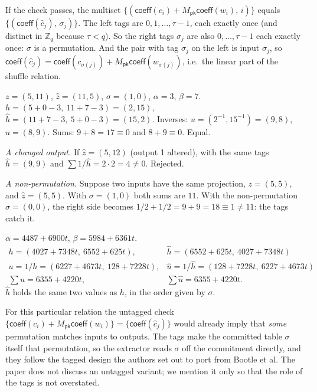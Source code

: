 \documentclass[11pt,a4paper]{article}
\newcommand{\Zq}{\mathbb{Z}_q}
\newcommand{\coeff}{\mathsf{coeff}}
\newcommand{\Mpk}{M_{\mathsf{pk}}}
\newcommand{\uh}{\hat{u}}
\newcommand{\hh}{\hat{h}}
\newcommand{\zh}{\hat{z}}
\newcommand{\ch}{\hat{c}}
\theoremstyle{definition}
\theoremstyle{plain}
\begin{document}
\begin{why}
If the check passes, the multiset $\{(\coeff(c_i)+\Mpk\coeff(w_i),\,i)\}$ equals
$\{(\coeff(\ch_j),\,\sigma_j)\}$. The left tags are $0,1,\dots,\tau-1$, each exactly once (and distinct in
$\Zq$ because $\tau<q$). So the right tags $\sigma_j$ are also $0,\dots,\tau-1$ each exactly once:
$\sigma$ is a permutation. And the pair with tag $\sigma_j$ on the left is input $\sigma_j$, so
$\coeff(\ch_j)=\coeff(c_{\sigma(j)})+\Mpk\coeff(w_{\sigma(j)})$, i.e.\ the linear part of the shuffle relation.
\end{why}

\begin{example}
$z=(5,11)$, $\zh=(11,5)$, $\sigma=(1,0)$, $\alpha=3$, $\beta=7$.
$h=(5+0-3,\ 11+7-3)=(2,15)$, $\hh=(11+7-3,\ 5+0-3)=(15,2)$.
Inverses: $u=(2^{-1},15^{-1})=(9,8)$, $\uh=(8,9)$. Sums: $9+8=17\equiv 0$ and $8+9\equiv 0$. Equal.

\emph{A changed output.} If $\zh=(5,12)$ (output 1 altered), with the same tags $\hh=(9,9)$ and
$\sum 1/\hh=2\cdot 2=4\neq 0$. Rejected.

\emph{A non-permutation.} Suppose two inputs have the same projection, $z=(5,5)$, and
$\zh=(5,5)$. With $\sigma=(1,0)$ both sums are $11$. With the non-permutation $\sigma=(0,0)$, the
right side becomes $1/2+1/2=9+9=18\equiv 1\neq 11$: the tags catch it.
\end{example}

\begin{toyrun}
$\alpha=4487{+}6900t$, $\beta=5984{+}6361t$.
\[
\begin{array}{ll}
h=(4027{+}7348t,\ 6552{+}625t), & \hh=(6552{+}625t,\ 4027{+}7348t)\\
u=1/h=(6227{+}4673t,\ 128{+}7228t), & \uh=1/\hh=(128{+}7228t,\ 6227{+}4673t)\\
\textstyle\sum u=6355{+}4220t, & \textstyle\sum\uh=6355{+}4220t .
\end{array}
\]
$\hh$ holds the same two values as $h$, in the order given by $\sigma$.
\end{toyrun}

\begin{caution}
For this particular relation the untagged check $\{\coeff(c_i)+\Mpk\coeff(w_i)\}=\{\coeff(\ch_j)\}$ would
already imply that \emph{some} permutation matches inputs to outputs. The tags make the committed table
$\sigma$ itself that permutation, so the extractor reads $\sigma$ off the commitment directly, and they
follow the tagged design the authors set out to port from Bootle et al. The paper does not discuss
an untagged variant; we mention it only so that the role of the tags is not overstated.
\end{caution}
\end{document}
